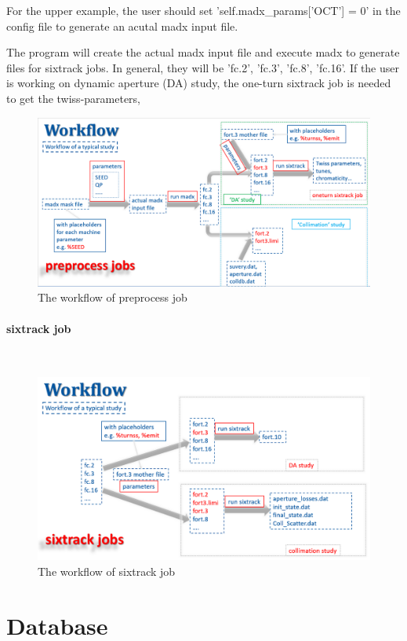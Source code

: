 For the upper example, the user should set 'self.madx\_params['OCT'] = 0' in the config file to generate an acutal madx input file.

The program will create the actual madx input file and execute madx to generate files for sixtrack jobs. In general, they will be 'fc.2', 'fc.3', 'fc.8', 'fc.16'. If the user is working on dynamic aperture (DA) study, the one-turn sixtrack job is needed to get the twiss-parameters, 
\begin{figure}[h]
\includegraphics[width=17cm]{preprocess.png}
\caption{The workflow of preprocess job}
\label{fig1}
\centering
\end{figure}

\paragraph{sixtrack job}~

\begin{figure}[h]
\includegraphics[width=17cm]{sixtrack.png}
\caption{The workflow of sixtrack job}
\label{fig2}
\centering
\end{figure}

\section{Database}


